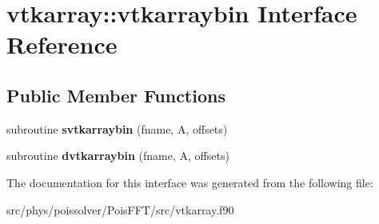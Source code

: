 \hypertarget{interfacevtkarray_1_1vtkarraybin}{}\section{vtkarray\+:\+:vtkarraybin Interface Reference}
\label{interfacevtkarray_1_1vtkarraybin}
\subsection*{Public Member Functions}
\begin{DoxyCompactItemize}
\item 
subroutine {\bfseries svtkarraybin} (fname, A, offsets)\hypertarget{interfacevtkarray_1_1vtkarraybin_aa0f95bf335a9c25f64ada9e3acefbb28}{}\label{interfacevtkarray_1_1vtkarraybin_aa0f95bf335a9c25f64ada9e3acefbb28}

\item 
subroutine {\bfseries dvtkarraybin} (fname, A, offsets)\hypertarget{interfacevtkarray_1_1vtkarraybin_a2a0be1bed3ece8b866af648888e186d4}{}\label{interfacevtkarray_1_1vtkarraybin_a2a0be1bed3ece8b866af648888e186d4}

\end{DoxyCompactItemize}


The documentation for this interface was generated from the following file\+:\begin{DoxyCompactItemize}
\item 
src/phys/poissolver/\+Pois\+F\+F\+T/src/vtkarray.\+f90\end{DoxyCompactItemize}
